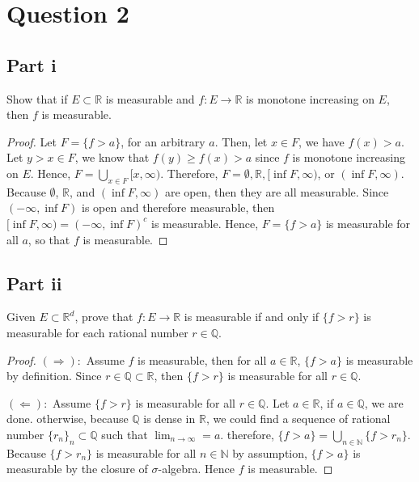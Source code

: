 \section{Question 2}

\subsection{Part i}

\begin{question}
    Show that if $E \subset \mathbb{R}$ is measurable and $f: E \rightarrow \mathbb{R}$ is monotone increasing on $E$, then $f$ is measurable.
\end{question}

\begin{answer}
    \begin{proof}
        Let $F = \{f > a\}$, for an arbitrary $a$. Then, let $x \in F$, we have $f(x) > a$. Let $y > x \in F$, we know that $f(y) \geq f(x) > a$ since $f$ is monotone increasing on $E$. Hence, $F = \bigcup_{x\in F}[x,\infty)$. Therefore, $F = \emptyset, \mathbb{R}, [\inf F, \infty)$, or $(\inf F, \infty)$. Because $\emptyset$, $\mathbb{R}$, and $(\inf F, \infty)$ are open, then they are all measurable. Since $(-\infty, \inf F)$ is open and therefore measurable, then $[\inf F, \infty) = (-\infty, \inf F)^c$ is measurable. Hence, $F = \{f > a\}$ is measurable for all $a$, so that $f$ is measurable.
    \end{proof}
\end{answer}

\subsection{Part ii}

\begin{question}
    Given $E \subset \mathbb{R}^d$, prove that $f: E \rightarrow \mathbb{R}$ is measurable if and only if $\{f>r\}$ is measurable for each rational number $r \in \mathbb{Q}$.
\end{question}

\begin{answer}
    \begin{proof}
        $(\Rightarrow):$ Assume $f$ is measurable, then for all $a \in \mathbb{R}$, $\{f > a\}$ is measurable by definition. Since $r \in \mathbb{Q} \subset \mathbb{R}$, then $\{f > r\}$ is measurable for all $r \in \mathbb{Q}$.
        
        $(\Leftarrow):$ Assume $\{f > r\}$ is measurable for all $r \in \mathbb{Q}$. Let $a \in \mathbb{R}$, if $a \in \mathbb{Q}$, we are done. otherwise, because $\mathbb{Q}$ is dense in $\mathbb{R}$, we could find a sequence of rational number $\{r_n\}_n \subset \mathbb{Q}$ such that $\lim_{n \to \infty} = a$. therefore, $\{f > a\} = \bigcup_{n \in \mathbb{N}}\{f > r_n\}$. Because $\{f > r_n\}$ is measurable for all $n \in \mathbb{N}$ by assumption, $\{f > a\}$ is measurable by the closure of $\sigma$-algebra. Hence $f$ is measurable.
    \end{proof}
\end{answer}


